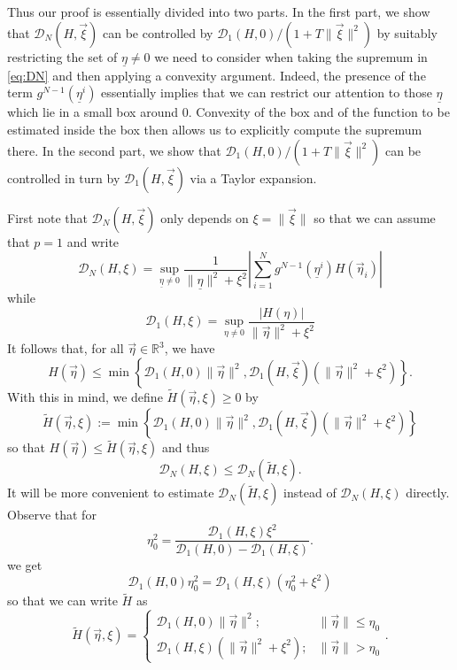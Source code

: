 \documentclass{article}
\newcommand\calD{{\mathcal D}}
\newcommand \ul[1]{\underline{#1}}
\renewcommand\v[1]{\vec{#1}}
\newcommand*\R{ \mathds{R} }
\newcommand\set[1]{\left\{ #1 \right\}}
\newcommand\ueta{{\underline \eta}}
\newcommand\vxi{{\vec \xi}}
\begin{document}
Thus our proof is essentially  divided into two parts. In the first part, we show that $\mathcal D_N(H,\v\xi)$ can be
controlled by $\mathcal D_1(H,0)/(1+T\|\vxi\|^2)$ by suitably restricting the set of $\ul \eta\ne0$ we need to consider
when taking the supremum in \eqref{eq:DN} and then applying a convexity argument. Indeed, the presence of the term
$g^{N-1}(\ueta^i)$ essentially implies that we can restrict our attention to those $\ul \eta$ which lie in a small box
around 0. Convexity of the box and of the function to be estimated inside the box then allows us to explicitly compute
the supremum there. In the second part, we show that $\mathcal D_1(H,0)/(1+T\|\vxi\|^2)$ can be controlled in turn by
$\mathcal D_1(H,\v\xi)$ via a Taylor expansion.

First note that $\calD_N(H,\v\xi)$ only depends on $\xi=\|\vxi\|$ so that we
can assume that $p=1$ and write
\[
\mathcal D_N(H,\xi)=\sup_{\ul \eta\not=0}\frac{1}{\|\ul \eta\|^2+\xi^2}
\left|\sum_{i=1}^N g^{ N - 1}(\ul \eta^i)H(\v\eta_i)\right|
\]
while
\begin{equation}\label{eq:D1}
\calD_1(H,\xi)=\sup_{\eta\not=0}\frac{|H(\eta)|}{\|\v\eta\|^2+\xi^2}
\end{equation}
It follows that, for all $\v\eta \in \R^3$, we have
\[
H(\v\eta) \leq \min\set{\calD_1(H,0)\|\v\eta\|^2, \calD_1(H,\v\xi)(\|\v\eta\|^2 + \xi^2)}.
\]
With this in mind, we define $\widetilde H(\v\eta,\xi) \geq 0$ by
\begin{equation}
\widetilde H(\v\eta,\xi) := \min\set{\calD_1(H,0)\|\v\eta\|^2, \calD_1(H,\v\xi)(\|\v\eta\|^2 + \xi^2)}
\end{equation}
so that $H(\v\eta) \leq \widetilde H(\v\eta,\xi)$ and thus
\begin{equation}\label{eq:DvsDtilde}
	\calD_N(H,\xi) \leq \calD_N(\widetilde H,\xi).
\end{equation} 
It will be more convenient to estimate $\calD_N(\widetilde H,\xi)$ instead of $\calD_N(H,\xi)$ directly.
Observe that for
\[
\eta_0^2 = \frac{\calD_1(H,\xi)\xi^2}{\calD_1(H,0) - \calD_1(H,\xi)}.
\]
we get
\[
\calD_1(H,0) \eta_0^2 = \calD_1(H,\xi) (\eta_0^2 + \xi^2)
\]
so that we can write $\widetilde H$ as
\begin{equation}
\widetilde H(\v\eta,\xi) = \begin{cases} \calD_1(H,0) \|\v\eta\|^2; &\|\v\eta\| \leq \eta_0\\ 
\calD_1(H,\xi)(\|\v\eta\|^2 + \xi^2); &\|\v\eta\|> \eta_0
\end{cases}.
\end{equation}
\end{document}

